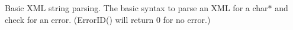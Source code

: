  Basic X\+M\+L string parsing. The basic syntax to parse an X\+M\+L for a char$\ast$ and check for an error. (Error\+I\+D() will return 0 for no error.) 
\begin{DoxyCodeInclude}

\end{DoxyCodeInclude}
 